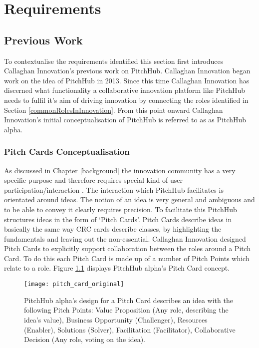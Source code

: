 \chapter{Requirements}\label{C:requirements}

\section{Previous Work}

To contextualise the requirements identified this section first introduces Callaghan Innovation's previous work on PitchHub. Callaghan Innovation began work on the idea of PitchHub in 2013. Since this time Callaghan Innovation has discerned what functionality a collaborative innovation platform like PitchHub needs to fulfil it's aim of driving innovation by connecting the roles identified in Section \ref{commonRolesInInnovation}. From this point onward Callaghan Innovation's initial conceptualisation of PitchHub is referred to as as PitchHub alpha.

\subsection{Pitch Cards Conceptualisation}
As discussed in Chapter \ref{background} the innovation community has a very specific purpose and therefore requires special kind of user participation/interaction \cite{Jruby:online}. The interaction which PitchHub facilitates is orientated around ideas. The notion of an idea is very general and ambiguous and to be able to convey it clearly requires precision. To facilitate this PitchHub structures ideas in the form of `Pitch Cards'. Pitch Cards describe ideas in basically the same way CRC cards describe classes, by highlighting the fundamentals and leaving out the non-essential. Callaghan Innovation designed Pitch Cards to explicitly support collaboration between the roles around a Pitch Card. To do this each Pitch Card is made up of a number of Pitch Points which relate to a role. Figure \ref{fig:pitch_card_original} displays PitchHub alpha's Pitch Card concept.
\begin{figure}[ht]
    \centering
    \texttt{[image: pitch\_card\_original]}
    \caption{PitchHub alpha's design for a Pitch Card describes an idea with the following Pitch Points: Value Proposition (Any role, describing the idea's value), Business Opportunity (Challenger), Resources (Enabler), Solutions (Solver), Facilitation (Facilitator), Collaborative Decision (Any role, voting on the idea).}
    \label{fig:pitch_card_original}
\end{figure}

